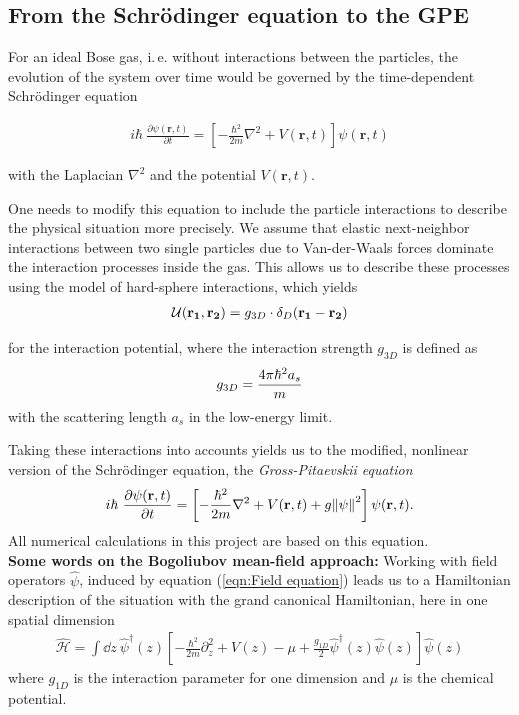 \subsection{From the Schr\"odinger equation to the GPE}
For an ideal Bose gas, i.\,e. without interactions between the particles, the evolution of the system over time would be governed by the time-dependent Schr\"odinger equation

\begin{align}
i\hbar\ \frac{\partial\psi(\mathbf{r}, t)}{\partial t} =
\left[ -\frac{\hbar^2}{2m} \nabla^2 + V(\mathbf{r}, t)\right]\psi(\mathbf{r}, t) \label{eqn:Schroedinger}
\end{align}

with the Laplacian $\nabla^2$ and the potential 
$V(\mathbf{r},t)$. 

One needs to modify this equation to include the particle interactions to describe the physical situation more precisely. We assume that elastic next-neighbor interactions between two single particles due to Van-der-Waals forces dominate the interaction processes inside the gas. This allows us to describe these processes using the model of hard-sphere interactions, which yields
\begin{align}
	\mathcal{U}(\mathbf{r_1}, \mathbf{r_2}) = g_{\tiny3D}\cdot \delta_D(\mathbf{r_1} - \mathbf{r_2})
\end{align}

for the interaction potential, where the interaction strength $g_{3D}$ is defined as
\begin{align}
	g_{\tiny{3D}} = \frac{4\pi\hbar^2 a_s}{m}
\end{align}
 with the scattering length $a_s$ in the low-energy limit. 

 Taking these interactions into accounts yields us to the modified, nonlinear version of the Schr\"odinger equation, the \textit{Gross-Pitaevskii equation}
\begin{align}
	i\hbar \ \frac{\partial\psi(\mathbf{r}, t)}{\partial t} = \left[-\frac{\hbar^2}{2m}\nabla^2 + V(\mathbf{r}, t) + g\norm{\psi}^2\right]\psi(\mathbf{r}, t).
\end{align}
All numerical calculations in this project are based on this equation. \\

\textbf{Some words on the Bogoliubov mean-field approach:} Working with field operators $\hat{\psi}$, induced by equation (\ref{eqn:Field equation}) leads us to a Hamiltonian description of the situation with the grand canonical Hamiltonian, here in one spatial dimension
\begin{align}
	\hat{\mathcal{H}} = \int \dd z \ \hat{\psi}^{\dagger}(z) \left[ -\frac{\hbar^2}{2m}\partial_z^2 + V(z) - \mu + \frac{g_{1D}}{2}\hat{\psi}^{\dagger}(z)\hat{\psi}(z)\right]\hat{\psi}(z)
\end{align}
where $g_{1D}$ is the interaction parameter for one dimension and $\mu$ is the chemical potential.

